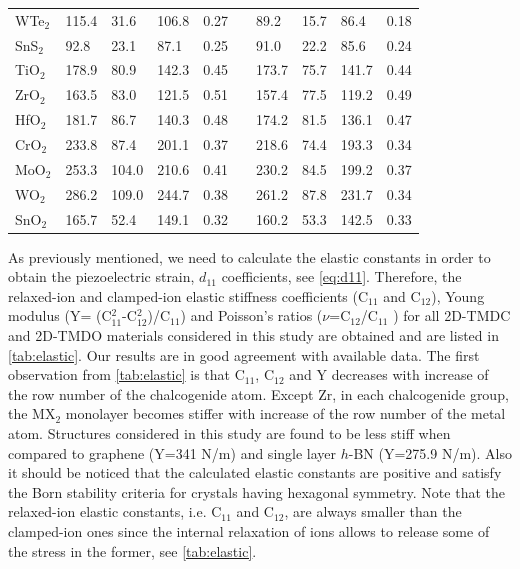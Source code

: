 \begin{table}[htbp]
\begin{tabularx}{\linewidth}{lXXXXsXXXX}
WTe$_2$ & 115.4 &  31.6 & 106.8 & 0.27 &&  89.2 & 15.7 &  86.4 & 0.18\\
SnS$_2$ &  92.8 &  23.1 &  87.1 & 0.25 &&  91.0 & 22.2 &  85.6 & 0.24\\
TiO$_2$ & 178.9 &  80.9 & 142.3 & 0.45 && 173.7 & 75.7 & 141.7 & 0.44\\
ZrO$_2$ & 163.5 &  83.0 & 121.5 & 0.51 && 157.4 & 77.5 & 119.2 & 0.49\\
HfO$_2$ & 181.7 &  86.7 & 140.3 & 0.48 && 174.2 & 81.5 & 136.1 & 0.47\\
CrO$_2$ & 233.8 &  87.4 & 201.1 & 0.37 && 218.6 & 74.4 & 193.3 & 0.34\\
MoO$_2$ & 253.3 & 104.0 & 210.6 & 0.41 && 230.2 & 84.5 & 199.2 & 0.37\\
WO$_2$  & 286.2 & 109.0 & 244.7 & 0.38 && 261.2 & 87.8 & 231.7 & 0.34\\
SnO$_2$ & 165.7 &  52.4 & 149.1 & 0.32 && 160.2 & 53.3 & 142.5 & 0.33\\
\hline\hline
\end{tabularx}
\end{table}

As previously mentioned, we need to calculate the elastic constants in order to obtain the piezoelectric strain, $d_{11}$ coefficients, see \autoref{eq:d11}. Therefore, the relaxed-ion and clamped-ion elastic stiffness coefficients (C$_{11}$ and C$_{12}$), Young modulus (Y= (C$_{11}^2$-C$_{12}^2$)/C$_{11}$) and Poisson's ratios ($\nu$=C$_{12}$/C$_{11}$ ) for all 2D-TMDC and 2D-TMDO materials considered in this study are obtained and are listed in \autoref{tab:elastic}. Our results are in good agreement with available data\cite{Peng2013,Kang2013,Duerloo2012,Cooper2013}. The first observation from \autoref{tab:elastic} is that C$_{11}$, C$_{12}$ and Y decreases with increase of the row number of the chalcogenide atom. Except Zr, in each chalcogenide group, the MX$_2$ monolayer becomes stiffer with increase of the row number of the metal atom. Structures considered in this study are found to be less stiff when compared to graphene (Y=341 N/m)\cite{QHA2} and single layer $h$-BN (Y=275.9 N/m)\cite{QHA2}. Also it should be noticed that the calculated elastic constants are positive and satisfy the Born stability criteria for crystals having hexagonal symmetry\cite{nye1985physical,Born1998}.  Note that the relaxed-ion elastic constants, i.e. C$_{11}$ and C$_{12}$, are always smaller than the clamped-ion ones since the internal relaxation of ions allows to release some of the stress in the former, see \autoref{tab:elastic}.

